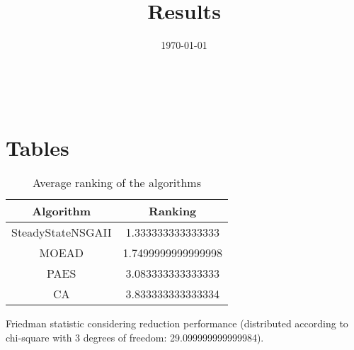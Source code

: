 \documentclass{article}
\title{Results}
\author{}
\date{\today}
\begin{document}
\oddsidemargin 0in \topmargin 0in\maketitle
\
\section{Tables}
\begin{table}[!htp]
\centering
\caption{Average ranking of the algorithms}
\begin{tabular}{c|c}
Algorithm&Ranking\\
\hline
SteadyStateNSGAII&1.333333333333333\\
MOEAD&1.7499999999999998\\
PAES&3.083333333333333\\
CA&3.833333333333334\\
\end{tabular}
\end{table}


Friedman statistic considering reduction performance (distributed according to chi-square with 3 degrees of freedom: 29.099999999999984).
\end{document}
